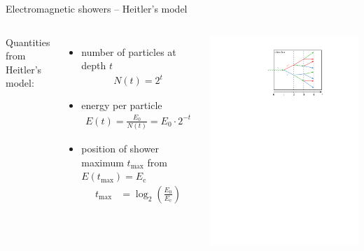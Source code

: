 \documentclass[11pt,xcolor=dvipsnames,professionalfonts]{beamer}
\begin{document}
\begin{frame}{Electromagnetic showers -- Heitler's model}
	\begin{columns}
		Quantities from Heitler's model:
		\begin{itemize}
			\setlength\itemsep{1.5em}
			\item number of particles at depth $t$
			\begin{align*}
				N(t) = 2^t
			\end{align*}
			
			\item energy per particle
			\begin{align*}
				E(t) = \frac{E_0}{N(t)} = E_0 \cdot 2^{-t}
			\end{align*}
			
			\item position of shower maximum $t_\mathrm{max}$ from $E(t_\mathrm{max}) = E_\mathrm{c}$
			\begin{align*}
				t_\mathrm{max} &= \log_2\left(\frac{E_0}{E_\mathrm{c}}\right)
			\end{align*}
		\end{itemize}
		
		\begin{center}
			\includegraphics[width=1.0\textwidth]{./figures/shower_cascadeunits.pdf}
		\end{center}
	\end{columns}
\end{frame}
\end{document}
